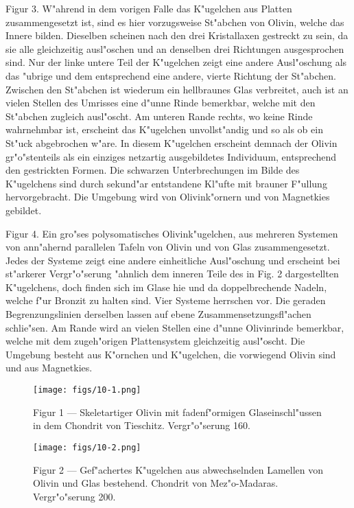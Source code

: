 \documentclass[a4paper, 11pt, oneside, polutonikogreek, german]{article}
\begin{document}
Figur 3. W"ahrend in dem vorigen Falle das K"ugelchen aus Platten zusammengesetzt ist, sind es hier vorzugsweise St"abchen von Olivin, welche das Innere bilden. Dieselben scheinen nach den drei Kristallaxen gestreckt zu sein, da sie alle gleichzeitig ausl"oschen und an denselben drei Richtungen ausgesprochen sind. Nur der linke untere Teil der K"ugelchen zeigt eine andere Ausl"oschung als das "ubrige und dem entsprechend eine andere, vierte Richtung der St"abchen. Zwischen den St"abchen ist wiederum ein hellbraunes Glas verbreitet, auch ist an vielen Stellen des Umrisses eine d"unne Rinde bemerkbar, welche mit den St"abchen zugleich ausl"oscht. Am unteren Rande rechts, wo keine Rinde wahrnehmbar ist, erscheint das K"ugelchen unvollst"andig und so als ob ein St"uck abgebrochen w"are. In diesem K"ugelchen erscheint demnach der Olivin gr"o"stenteils als ein einziges netzartig ausgebildetes Individuum, entsprechend den gestrickten Formen. Die schwarzen Unterbrechungen im Bilde des K"ugelchens sind durch sekund"ar entstandene Kl"ufte mit brauner F"ullung hervorgebracht. Die Umgebung wird von Olivink"ornern und von Magnetkies gebildet.

Figur 4. Ein gro"ses polysomatisches Olivink"ugelchen, aus mehreren Systemen von ann"ahernd parallelen Tafeln von Olivin und von Glas zusammengesetzt. Jedes der Systeme zeigt eine andere einheitliche Ausl"oschung und erscheint bei st"arkerer Vergr"o"serung "ahnlich dem inneren Teile des in Fig. 2 dargestellten K"ugelchens, doch finden sich im Glase hie und da doppelbrechende Nadeln, welche f"ur Bronzit zu halten sind. Vier Systeme herrschen vor. Die geraden Begrenzungslinien derselben lassen auf ebene Zusammensetzungsfl"achen schlie"sen. Am Rande wird an vielen Stellen eine d"unne Olivinrinde bemerkbar, welche mit dem zugeh"origen Plattensystem gleichzeitig ausl"oscht. Die Umgebung besteht aus K"ornchen und K"ugelchen, die vorwiegend Olivin sind und aus Magnetkies.
\clearpage

\vspace*{\fill}
\begin{figure}[H]
\centering
\texttt{[image: figs/10-1.png]}
\caption{\small Figur 1 --- Skeletartiger Olivin mit fadenf"ormigen Glaseinschl"ussen in dem Chondrit von Tieschitz. Vergr"o"serung 160.}
\end{figure}
\vspace*{\fill}
\clearpage

\vspace*{\fill}
\begin{figure}[H]
\centering
\texttt{[image: figs/10-2.png]}
\caption{\small Figur 2 --- Gef"achertes K"ugelchen aus abwechselnden Lamellen von Olivin und Glas bestehend. Chondrit von Mez"o-Madaras. Vergr"o"serung 200.}
\end{figure}
\vspace*{\fill}
\clearpage
\end{document}
